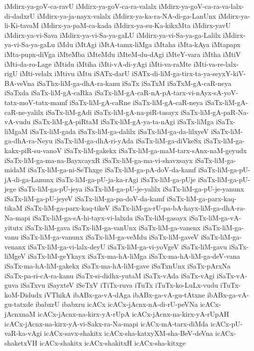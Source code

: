 {iMdirx-ya-goV-ca-ravU
iMdirx-ya-goV-ca-ra-valalx
iMdirx-ya-goV-ca-ra-va-lalx-di-dadxrU
iMdirx-ya-ja-nayx-valalx
iMdirx-ya-ka-ra-NA-di-ga-LanUnx
iMdirx-ya-li-Ki-tavaM
iMdirx-ya-paM-ca-kada
iMdirx-ya-su-Ka-kikxMta
iMdirx-yavU
iMdirx-ya-vi-Sava
iMdirx-ya-vi-Sa-ya-gaLU
iMdirx-ya-vi-Sa-ya-ga-Lalilx
iMdirx-ya-vi-Sa-ya-gaLu
iMdu
iMtAgi
iMtA-tamx-liMga
iMtaha
iMta-kAya
iMtapapx
iMta-pupx-diVga
iMteMba
iMteMdu
iMteM-du-dAgi
iMteY-vara
iMtha
iMtiV
iMti-da-ro-Lage
iMtidu
iMtiha
iMti-vA-di-yAgi
iMti-va-raMte
iMti-va-re-lalx-rigU
iMti-velalx
iMtivu
iMtu
iSATx-darU
iSATx-di-liM-ga-tirx-ta-ya-seyxY-kiV-BA-veVna
iSaThx-liM-ga-dhA-ra-kanu
iSaTx
iSaTxM
iSaTxM-gA-caR-neya
iSaTxda
iSaTx-liM-gA-caRka
iSaTx-liM-gA-caR-nA-pA-tarx-vi-nAyx-sA-yoV-tatx-moV-tatx-mamf
iSaTx-liM-gA-caRne
iSaTx-liM-gA-caR-neya
iSaTx-liM-gA-caR-ne-yalilx
iSaTx-liM-gAdi
iSaTx-liM-gA-na-piR-tasayx
iSaTx-liM-gA-paR-Na-vA-vudu
iSaTx-liM-gA-piRtaM
iSaTx-liM-gA-ya-ta-nAgi
iSaTx-liMga
iSaTx-liMgaM
iSaTx-liM-gada
iSaTx-liM-ga-dalilx
iSaTx-liM-ga-da-lilxyeV
iSaTx-liM-ga-dhA-ra-Neyu
iSaTx-liM-ga-dhA-ri-yAda
iSaTx-liM-ga-diVkeSx
iSaTx-liM-ga-kakx-piR-su-vanoV
iSaTx-liM-gakekx
iSaTx-liM-ga-maM-tarx-sAnx-naM-geyudx
iSaTx-liM-ga-ma-na-BayxcayxR
iSaTx-liM-ga-ma-vi-shavxsayx
iSaTx-liM-ga-midaM
iSaTx-liM-ga-ni-SeThxge
iSaTx-liM-ga-pA-doV-da-kamf
iSaTx-liM-ga-pU-jA-di-ga-Lanunx
iSaTx-liM-ga-pU-ja-ka-rAgi
iSaTx-liM-ga-pUje
iSaTx-liM-ga-pU-jege
iSaTx-liM-ga-pU-jeya
iSaTx-liM-ga-pU-je-yalilx
iSaTx-liM-ga-pU-je-yanunx
iSaTx-liM-ga-pU-jeyeV
iSaTx-liM-ga-pa-doV-da-kamf
iSaTx-liM-ga-parx-kaq-tikaM
iSaTx-liM-ga-parx-kaq-tikeV
iSaTx-liM-ga-rU-pa-bA-hayx-liM-ga-dhA-ra-Na-mapi
iSaTx-liM-ga-sA-hi-tayx-vi-lalxda
iSaTx-liM-gasayx
iSaTx-liM-ga-vA-yitutx
iSaTx-liM-gava
iSaTx-liM-ga-vanUnx
iSaTx-liM-ga-vanenx
iSaTx-liM-ga-vanu
iSaTx-liM-ga-vanunx
iSaTx-liM-ga-veMdu
iSaTx-liM-gaveV
iSaTx-liM-ga-venanx
iSaTx-liM-ga-vi-lalx-deyU
iSaTx-liM-ga-vi-yoVgeV
iSaTx-liM-gavu
iSaTx-liMgeV
iSaTx-liM-geYkayx
iSaTx-ma-hA-liMga
iSaTx-ma-hA-liM-ga-deV-vana
iSaTx-ma-hA-liM-gakekx
iSaTx-ma-hA-liM-gave
iSaTxnUnx
iSaTx-pArxNa
iSaTx-pa-ri-cA-ra-kanu
iSaTx-si-didhx-yutaM
iSaTx-vAda
iSaTx-vAgi
iSaTx-vA-guva
iSaTxvu
iSayxteV
iSeTxV
iTiTx-ruva
iTuTx
iTuTx-ko-LuLx-vudu
iTuTx-koM-Didudx
iVThikA
ibABx-ga-vA-dAga
ibABx-ga-vA-gu-tAtxne
ibABx-ga-vA-gu-tatxde
ibabxrU
ibabxru
icACx
icACx-jAcnx-nA-di-rU-peVNa
icACx-jAcnxnaM
icACx-jAcnx-na-kirx-yA-rUpA
icACx-jAcnx-na-kirx-yA-rUpAH
icACx-jAcnx-na-kirx-yA-vi-Sakx-ra-Na-mapi
icACx-mA-tarx-diMda
icACx-pU-vaR-ka-vAgi
icACx-savx-shakitx
icACx-sha-katxyXM-sha-BeV-deVna
icACx-shaketxVH
icACx-shakitx
icACx-shakitxH
icACx-sha-kitxge
}
